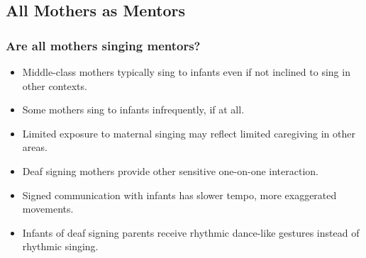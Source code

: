 \documentclass{beamer}
\begin{document}
\subsection*{All Mothers as Mentors}
\begin{frame}
	\frametitle{Are all mothers singing mentors?}
	\begin{itemize}
		\item Middle-class mothers typically sing to infants even if not inclined to sing in other contexts.\\
		\item Some mothers sing to infants infrequently, if at all.\\
		\item Limited exposure to maternal singing may reflect limited caregiving in other areas.\\
		\pause %
		\item Deaf signing mothers provide other sensitive one-on-one interaction.\\
		\item Signed communication with infants has slower tempo, more exaggerated movements.\\
		\item Infants of deaf signing parents receive rhythmic dance-like gestures instead of rhythmic singing.\\
	\end{itemize}
\end{frame}
\end{document}
